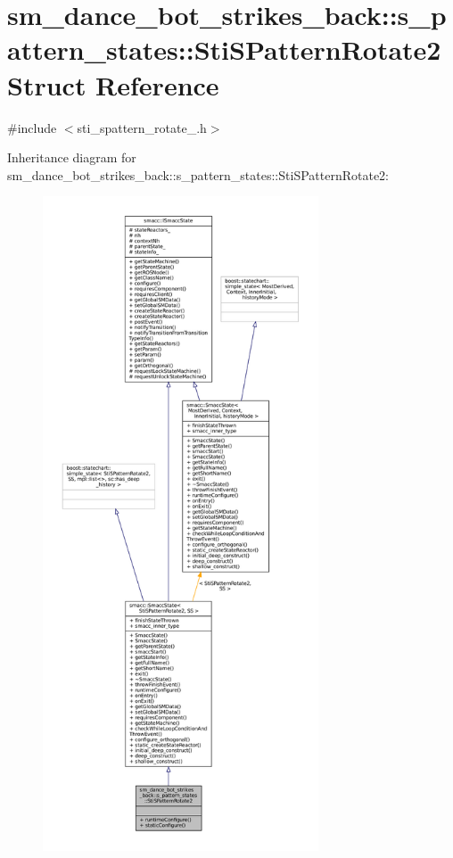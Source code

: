 \hypertarget{structsm__dance__bot__strikes__back_1_1s__pattern__states_1_1StiSPatternRotate2}{}\section{sm\+\_\+dance\+\_\+bot\+\_\+strikes\+\_\+back\+:\+:s\+\_\+pattern\+\_\+states\+:\+:Sti\+S\+Pattern\+Rotate2 Struct Reference}
\label{structsm__dance__bot__strikes__back_1_1s__pattern__states_1_1StiSPatternRotate2}


{\ttfamily \#include $<$sti\+\_\+spattern\+\_\+rotate\+\_.\+h$>$}



Inheritance diagram for sm\+\_\+dance\+\_\+bot\+\_\+strikes\+\_\+back\+:\+:s\+\_\+pattern\+\_\+states\+:\+:Sti\+S\+Pattern\+Rotate2\+:
\nopagebreak
\begin{figure}[H]
\begin{center}
\leavevmode
\includegraphics[height=550pt]{structsm__dance__bot__strikes__back_1_1s__pattern__states_1_1StiSPatternRotate2__inherit__graph}
\end{center}
\end{figure}



